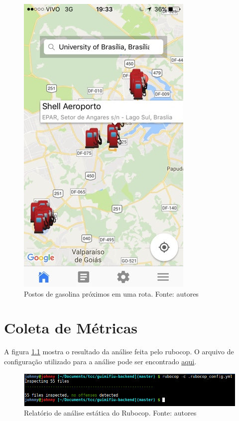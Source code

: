 \begin{anexosenv}
\begin{figure}[H]
    \centering
    \includegraphics[scale=0.5]{figuras/app_5.jpg}
    \caption[Postos de gasolina próximos em uma rota]{Postos de gasolina próximos em uma rota. Fonte: autores}
    \label{img:postos_de_gasolina_proximos_em_uma_rota}
\end{figure}

\chapter{Coleta de Métricas}
\label{chap:metricas}

A figura \ref{img:rubocop} mostra o resultado da análise feita pelo rubocop. O arquivo de configuração utilizado para a análise pode ser encontrado \href{https://github.com/Guimifiu/guimifiu-backend/blob/master/.rubocop_config.yml}{aqui}.

\begin{figure}[H]
    \centering
    \includegraphics[scale=0.5]{figuras/rubocop.png}
    \caption[Relatório de análise estática do Rubocop]{Relatório de análise estática do Rubocop. Fonte: autores}
    \label{img:rubocop}
\end{figure}


\end{anexosenv}
